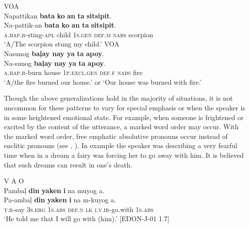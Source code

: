 \ea 
\label{bkm:Ref113974691}
\hspace{.2cm}V\hspace{1.5cm}O\hspace{1.8cm}A \\
Napattikan  \textbf{bata}  \textbf{ko}  \textbf{an}  \textbf{ta}  \textbf{sitsipit}. \\\smallskip
\gll Na-pattik-an  \textbf{bata}  \textbf{ko}  \textbf{an}  \textbf{ta}  \textbf{sitsipit}. \\
\textsc{a.hap.r}-sting-\textsc{apl}  child  1\textsc{s.gen}  \textsc{def.m}  \textsc{nabs}  scorpion \\
\glt ‘A/The scorpion stung my child.’
\z
\ea
\label{bkm:Ref113974693}
\hspace{.2cm}V\hspace{1.2cm}O\hspace{2cm}A \\
Nasunog  \textbf{baļay  nay  ya}  \textbf{ta}  \textbf{apoy}. \\\smallskip
\gll Na-sunog  \textbf{baļay}  \textbf{nay}  \textbf{ya}  \textbf{ta}  \textbf{apoy}. \\
\textsc{a.hap.r}-burn  house  1\textsc{p.excl.gen}  \textsc{def.f}  \textsc{nabs}  fire \\
\glt ‘A/the fire burned our house.’ or ‘Our house was burned with fire.’
\z

Though the above generalizations hold in the majority of situations, it is not uncommon for these patterns to vary for special emphasis or when the speaker is in some heightened emotional state. For example, when someone is frightened or excited by the content of the utterance, a marked word order may occur. With the marked word order, free emphatic absolutive pronouns occur instead of enclitic pronouns (see , ). In example  the speaker was describing a very fearful time when in a dream a fairy was forcing her to go away with him. It is believed that such dreams can result in one’s death.

\ea 

\label{bkm:Ref447287658}
\hspace{.1cm}V\hspace{.8cm}   A\hspace{.5cm}      O \\
Pambaļ  \textbf{din}  \textbf{yaken}  \textbf{i}  na  muyog  a. \\\smallskip
\gll Pa-ambaļ  \textbf{din}  \textbf{yaken}  \textbf{i}  na  m-kuyog  a. \\
\textsc{t.r}-say  3\textsc{s.erg}  1\textsc{s.abs}  \textsc{def.n}  \textsc{lk}  \textsc{i.v.ir}-go.with  1\textsc{s.abs} \\
\glt ‘He told me that I will go with (him).’ [EDON-J-01 1.7]
\z

